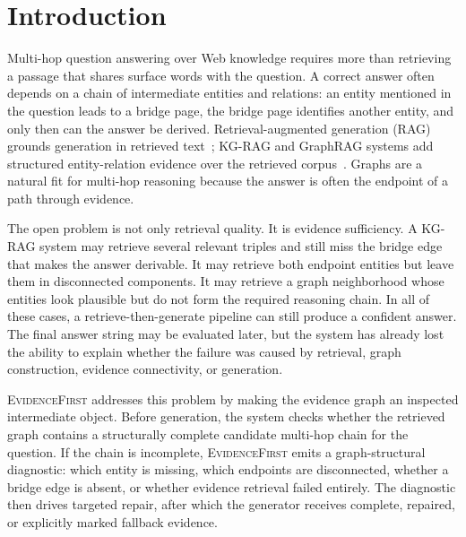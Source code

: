 \documentclass[runningheads]{llncs}
\newcommand{\sys}{\textsc{EvidenceFirst}\xspace}
\begin{document}
\section{Introduction}
\label{sec:intro}

Multi-hop question answering over Web knowledge requires more than retrieving a
passage that shares surface words with the question. A correct answer often
depends on a chain of intermediate entities and relations: an entity mentioned
in the question leads to a bridge page, the bridge page identifies another
entity, and only then can the answer be derived. Retrieval-augmented generation
(RAG) grounds generation in retrieved text~\cite{lewis2020rag}; KG-RAG and
GraphRAG systems add structured entity-relation evidence over the retrieved
corpus~\cite{edge2024graphrag,guo2024lightrag,han2025graphragsurvey}. Graphs
are a natural fit for multi-hop reasoning because the answer is often the
endpoint of a path through evidence.

The open problem is not only retrieval quality. It is evidence sufficiency. A
KG-RAG system may retrieve several relevant triples and still miss the bridge
edge that makes the answer derivable. It may retrieve both endpoint entities
but leave them in disconnected components. It may retrieve a graph neighborhood
whose entities look plausible but do not form the required reasoning chain. In
all of these cases, a retrieve-then-generate pipeline can still produce a
confident answer. The final answer string may be evaluated later, but the
system has already lost the ability to explain whether the failure was caused
by retrieval, graph construction, evidence connectivity, or generation.

\sys addresses this problem by making the evidence graph an inspected
intermediate object. Before generation, the system checks whether the retrieved
graph contains a structurally complete candidate multi-hop chain for the
question. If the chain is incomplete, \sys emits a graph-structural diagnostic:
which entity is missing, which endpoints are disconnected, whether a bridge edge
is absent, or whether evidence retrieval failed entirely. The diagnostic then
drives targeted repair, after which the generator receives complete, repaired,
or explicitly marked fallback evidence.
\end{document}
